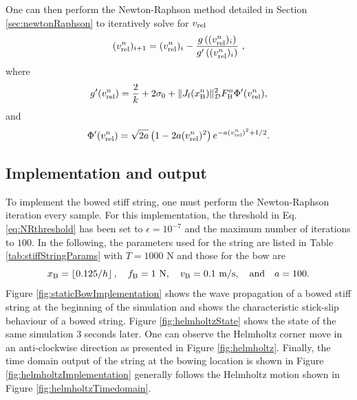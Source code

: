 One can then perform the Newton-Raphson method detailed in Section \ref{sec:newtonRaphson} to iteratively solve for $v_\text{rel}$ 
%
\begin{equation}
    (v_\text{rel}^n)_{i+1} = (v_\text{rel}^n)_i - \frac{g\left((v_\text{rel}^n)_i\right)}{g'\left((v_\text{rel}^n)_i\right)}\ ,
\end{equation}
where
\begin{equation}
    g'(v_\text{rel}^n) = \frac{2}{k} + 2\sigma_{0} + \lVert J_l(x_{\text{B}}^n)\rVert^2_{\mathcal{D}} F_{\text{B}}^n\Phi'(v_\text{rel}^n),
\end{equation}
and 
\begin{equation*}
    \begin{aligned}
        \Phi'(\vrel^n) %
        = \sqrt{2a}\left(1 - 2a(\vrel^n)^2\right)e^{-a(\vrel^n)^2+1/2}.
    \end{aligned}
\end{equation*}
\subsection{Implementation and output}\label{sec:staticImplementation}
To implement the bowed stiff string, one must perform the Newton-Raphson iteration every sample. For this implementation, the threshold in Eq. \eqref{eq:NRthreshold} has been set to $\epsilon = 10^{-7}$ and the maximum number of iterations to $100$. In the following, the parameters used for the string are listed in Table \ref{tab:stiffStringParams} with $T = 1000$ N and those for the bow are
\begin{equation*}
    x_\Btxt = \floor[0.125/h],\quad f_\Btxt = 1\ \text{N},\quad v_\Btxt = 0.1\  \text{m/s},\qaq a = 100.
\end{equation*}
Figure \ref{fig:staticBowImplementation} shows the wave propagation of a bowed stiff string at the beginning of the simulation and shows the characteristic stick-slip behaviour of a bowed string. Figure \ref{fig:helmholtzState} shows the state of the same simulation 3 seconds later. One can observe the Helmholtz corner move in an anti-clockwise direction as presented in Figure \ref{fig:helmholtz}. Finally, the time domain output of the string at the bowing location is shown in Figure \ref{fig:helmholtzImplementation} generally follows the Helmholtz motion shown in Figure \ref{fig:helmholtzTimedomain}. 

